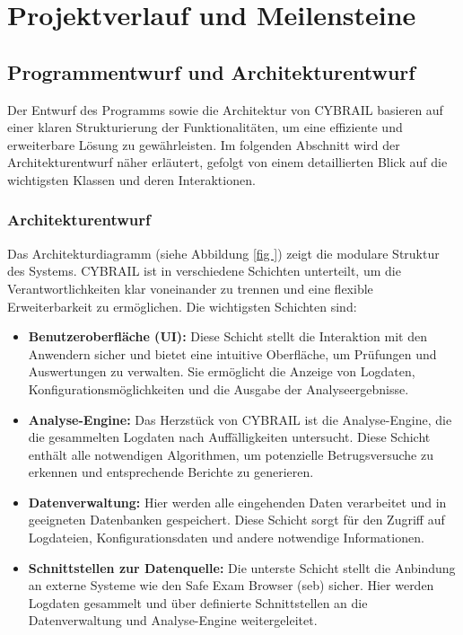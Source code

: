 \chapter{Projektverlauf und Meilensteine} \label{ch:projektverlauf}
\section{Programmentwurf und Architekturentwurf}

Der Entwurf des Programms sowie die Architektur von CYBRAIL basieren auf einer klaren Strukturierung der Funktionalitäten, um eine effiziente und erweiterbare Lösung zu gewährleisten. 
Im folgenden Abschnitt wird der Architekturentwurf näher erläutert, gefolgt von einem detaillierten Blick auf die wichtigsten Klassen und deren Interaktionen.

\subsection{Architekturentwurf}

Das Architekturdiagramm (siehe Abbildung \ref{fig
}) zeigt die modulare Struktur des Systems. 
CYBRAIL ist in verschiedene Schichten unterteilt, um die Verantwortlichkeiten klar voneinander zu trennen und eine flexible Erweiterbarkeit zu ermöglichen. Die wichtigsten Schichten sind:

\begin{itemize} 
\item \textbf{Benutzeroberfläche (UI):} Diese Schicht stellt die Interaktion mit den Anwendern sicher und bietet eine intuitive Oberfläche, um Prüfungen und Auswertungen zu verwalten. 
Sie ermöglicht die Anzeige von Logdaten, Konfigurationsmöglichkeiten und die Ausgabe der Analyseergebnisse. 
\item \textbf{Analyse-Engine:} Das Herzstück von CYBRAIL ist die Analyse-Engine, die die gesammelten Logdaten nach Auffälligkeiten untersucht. 
Diese Schicht enthält alle notwendigen Algorithmen, um potenzielle Betrugsversuche zu erkennen und entsprechende Berichte zu generieren. 
\item \textbf{Datenverwaltung:} Hier werden alle eingehenden Daten verarbeitet und in geeigneten Datenbanken gespeichert. 
Diese Schicht sorgt für den Zugriff auf Logdateien, Konfigurationsdaten und andere notwendige Informationen. 
\item \textbf{Schnittstellen zur Datenquelle:} Die unterste Schicht stellt die Anbindung an externe Systeme wie den Safe Exam Browser (\gls{seb}) sicher. 
Hier werden Logdaten gesammelt und über definierte Schnittstellen an die Datenverwaltung und Analyse-Engine weitergeleitet. \end{itemize}

